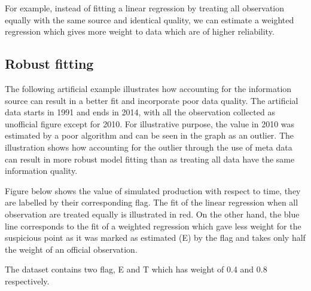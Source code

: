 \documentclass[nojss]{jss}\usepackage[]{graphicx}\usepackage[]{color}
\begin{document}
For example, instead of fitting a linear regression by treating all
observation equally with the same source and identical quality, we can
estimate a weighted regression which gives more weight to data which
are of higher reliability.


\subsection{Robust fitting}
The following artificial example illustrates how accounting for the
information source can result in a better fit and incorporate poor
data quality. The artificial data starts in 1991 and ends in 2014,
with all the observation collected as unofficial figure except for
2010. For illustrative purpose, the value in 2010 was estimated by a
poor algorithm and can be seen in the graph as an outlier. The
illustration shows how accounting for the outlier through the use of
meta data can result in more robust model fitting than as treating all
data have the same information quality.

Figure below shows the value of simulated production with respect to
time, they are labelled by their corresponding flag. The fit of the
linear regression when all observation are treated equally is
illustrated in red. On the other hand, the blue line corresponds to
the fit of a weighted regression which gave less weight for the
suspicious point as it was marked as estimated (E) by the flag and
takes only half the weight of an official observation.

The dataset contains two flag, E and T which has weight of 0.4 and 0.8
respectively.
\end{document}
